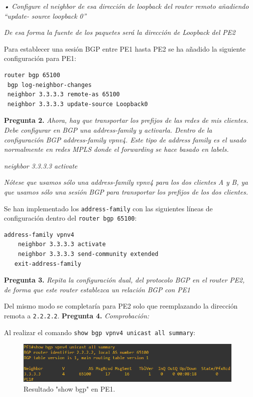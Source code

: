 \documentclass[a4paper, 12pt]{report}
\begin{document}
\textit{• Configure el neighbor de esa dirección de loopback del router remoto añadiendo “update-
source loopback 0”}

\textit{De esa forma la fuente de los paquetes será la dirección de Loopback del PE2}

Para establecer una sesión BGP entre PE1 hasta PE2 se ha añadido la siguiente configuración para PE1:
\begin{lstlisting}[language=bash, caption={Configuración OSPF en el Router LS1}]
router bgp 65100
 bgp log-neighbor-changes
 neighbor 3.3.3.3 remote-as 65100
 neighbor 3.3.3.3 update-source Loopback0
\end{lstlisting}

\textbf{Pregunta 2.}
\textit{Ahora, hay que transportar los prefijos de las redes de mis clientes. Debe configurar en BGP
una address-family y activarla. Dentro de la configuración BGP
address-family vpnv4. Este tipo de address family es el usado normalmente en redes
MPLS donde el forwarding se hace basado en labels.}

\textit{neighbor 3.3.3.3 activate}

\textit{Nótese que usamos sólo una address-family vpnv4 para los dos clientes A y B, ya que usamos
sólo una sesión BGP para transportar los prefijos de los dos clientes.}

Se han implementado los \texttt{address-family} con las siguientes líneas de configuración dentro del \texttt{router bgp 65100}:

\begin{lstlisting}[language=bash, caption={Configuración OSPF en el Router LS1}]
    address-family vpnv4
    neighbor 3.3.3.3 activate
    neighbor 3.3.3.3 send-community extended
   exit-address-family
\end{lstlisting}

\textbf{Pregunta 3.}
\textit{Repita la configuración dual, del protocolo BGP en el router PE2, de forma que este router
establezca un relación BGP con PE1}

Del mismo modo se  completaría para PE2 solo que reemplazando la dirección remota a \texttt{2.2.2.2}.
\newpage
\textbf{Pregunta 4.}
\textit{Comprobación:}

Al realizar el comando \texttt{show bgp vpnv4 unicast all summary}:
\begin{figure}[H]
	\centering
	\includegraphics[scale=0.7]{bgppe1.png}
	\caption{Resultado "show bgp" en PE1.}
	\label{fig:bgppe1}
\end{figure}
\end{document}
